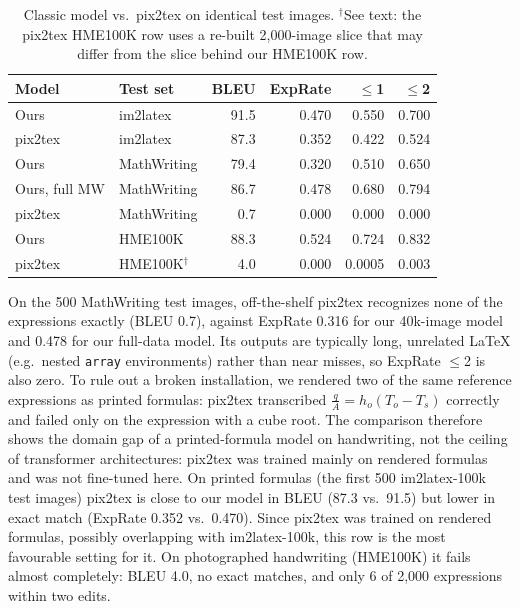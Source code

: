 \documentclass[conference]{IEEEtran}
\begin{document}
\begin{table}[t]
\caption{Classic model vs.\ pix2tex on identical test images. $^\dagger$See text: the pix2tex HME100K row uses a re-built 2{,}000-image slice that may differ from the slice behind our HME100K row.}
\label{tab:pix2tex}
\centering
\setlength{\tabcolsep}{4pt}
\begin{tabular}{llrrrr}
\toprule
Model & Test set & BLEU & ExpRate & $\le$1 & $\le$2 \\
\midrule
Ours & im2latex & 91.5 & 0.470 & 0.550 & 0.700 \\
pix2tex & im2latex & 87.3 & 0.352 & 0.422 & 0.524 \\
\midrule
Ours & MathWriting & 79.4 & 0.320 & 0.510 & 0.650 \\
Ours, full MW & MathWriting & 86.7 & 0.478 & 0.680 & 0.794 \\
pix2tex & MathWriting & 0.7 & 0.000 & 0.000 & 0.000 \\
\midrule
Ours & HME100K & 88.3 & 0.524 & 0.724 & 0.832 \\
pix2tex & HME100K$^\dagger$ & 4.0 & 0.000 & 0.0005 & 0.003 \\
\bottomrule
\end{tabular}
\end{table}

On the 500 MathWriting test images, off-the-shelf pix2tex recognizes none of the expressions exactly (BLEU 0.7), against ExpRate 0.316 for our 40k-image model and 0.478 for our full-data model. Its outputs are typically long, unrelated \LaTeX{} (e.g.\ nested \texttt{array} environments) rather than near misses, so ExpRate $\le$2 is also zero. To rule out a broken installation, we rendered two of the same reference expressions as printed formulas: pix2tex transcribed $\frac{q}{A}=h_{o}(T_{o}-T_{s})$ correctly and failed only on the expression with a cube root. The comparison therefore shows the domain gap of a printed-formula model on handwriting, not the ceiling of transformer architectures: pix2tex was trained mainly on rendered formulas and was not fine-tuned here. On printed formulas (the first 500 im2latex-100k test images) pix2tex is close to our model in BLEU (87.3 vs.\ 91.5) but lower in exact match (ExpRate 0.352 vs.\ 0.470). Since pix2tex was trained on rendered formulas, possibly overlapping with im2latex-100k, this row is the most favourable setting for it. On photographed handwriting (HME100K) it fails almost completely: BLEU 4.0, no exact matches, and only 6 of 2{,}000 expressions within two edits.
\end{document}
